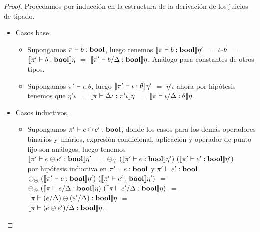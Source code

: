 \begin{proof}
Procedamos por inducci\'on en la estructura de la derivaci\'on de los juicios de tipado.

\begin{itemize}
\item Casos base
\begin{itemize}
\item Supongamos $\pi \vdash b : \textbf{bool}$, luego tenemos 
$\llbracket \pi \vdash b : \textbf{bool} \rrbracket\eta'$ $=$ $\iota_{\uparrow} b$ $=$ 
$\llbracket \pi' \vdash b : \textbf{bool} \rrbracket\eta$ $=$ $\llbracket \pi' \vdash b / \Delta : \textbf{bool} \rrbracket\eta$.
An\'alogo para constantes de otros tipos.

\item Supongamos $\pi' \vdash \iota : \theta$, luego 
$\llbracket \pi' \vdash \iota : \theta \rrbracket\eta'$ $=$ $\eta'\iota$
ahora por hip\'otesis tenemos que 
$\eta'\iota$ $=$ $\llbracket \pi \vdash \Delta\iota : \pi'\iota \rrbracket\eta$ $=$
$\llbracket \pi \vdash \iota / \Delta : \theta \rrbracket\eta$.
\end{itemize}

\item Casos inductivos,
\begin{itemize}
\item Supongamos $\pi' \vdash e \ominus e' : \textbf{bool}$, donde los casos para
los dem\'as operadores binarios y un\'arios, expresi\'on condicional, aplicaci\'on
y operador de punto fijo son an\'alogos, luego tenemos \\

$\llbracket \pi' \vdash e \ominus e' : \textbf{bool} \rrbracket\eta'$ $=$ 
$\ominus_{\circledcirc} \ (\semBrcks{\pi' \vdash e : \boolt}\eta') \ 
						  (\semBrcks{\pi' \vdash e' : \boolt}\eta')$\\
						
por hip\'otesis inductiva en $\pi' \vdash e : \textbf{bool}$ y $\pi' \vdash e' : \textbf{bool}$\\

$\ominus_{\circledcirc} \ (\semBrcks{\pi' \vdash e : \boolt}\eta') \ 
						   (\semBrcks{\pi' \vdash e' : \boolt}\eta')$ $=$\\
$\ominus_{\circledcirc} \ (\semBrcks{\pi \vdash e / \Delta : \boolt}\eta) \ 
						   (\semBrcks{\pi \vdash e' / \Delta: \boolt}\eta)$ $=$\\
$\llbracket \pi \vdash (e / \Delta) \ominus (e' / \Delta) : \textbf{bool} \rrbracket\eta$ $=$\\
$\llbracket \pi \vdash (e \ominus e') / \Delta : \textbf{bool} \rrbracket\eta$.\\


\end{itemize}
\end{itemize}
\end{proof}

